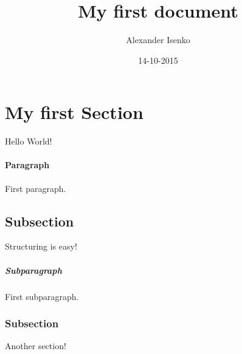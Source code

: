 \documentclass{article}
\title{My first document}
\date{14-10-2015}
\author{Alexander Isenko}
\begin{document}
\maketitle
\newpage
{}

\section{My first Section}
Hello World!

\paragraph{Paragraph}

First paragraph.

\subsection{Subsection}

Structuring is easy!

\subparagraph{Subparagraph}

First subparagraph.

\subsubsection{Subsection}

Another section!
\end{document}
